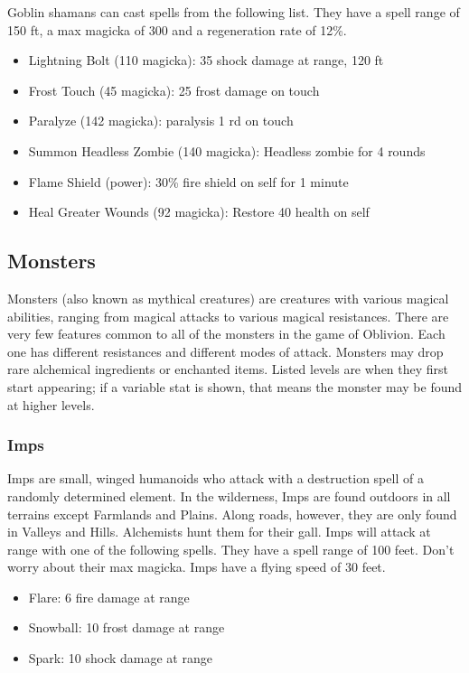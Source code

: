 \documentclass[12pt]{book}
\begin{document}
Goblin shamans can cast spells from the following list. They have a spell range of 150 ft, a max magicka of 300 and a regeneration rate of 12\%.\\
\begin{itemize}
	\item Lightning Bolt (110 magicka): 35 shock damage at range, 120 ft
	\item Frost Touch (45 magicka): 25 frost damage on touch
	\item Paralyze (142 magicka): paralysis 1 rd on touch
	\item Summon Headless Zombie (140 magicka): Headless zombie for 4 rounds
	\item Flame Shield (power): 30\% fire shield on self for 1 minute
	\item Heal Greater Wounds (92 magicka): Restore 40 health on self
\end{itemize}

\subsection{Monsters}
Monsters (also known as mythical creatures) are creatures with various magical abilities, ranging from magical attacks to various magical resistances. There are very few features common to all of the monsters in the game of Oblivion. Each one has different resistances and different modes of attack. Monsters may drop rare alchemical ingredients or enchanted items. Listed levels are when they first start appearing; if a variable stat is shown, that means the monster may be found at higher levels.

\subsubsection{Imps}
Imps are small, winged humanoids who attack with a destruction spell of a randomly determined element. In the wilderness, Imps are found outdoors in all terrains except Farmlands and Plains. Along roads, however, they are only found in Valleys and Hills. Alchemists hunt them for their gall. Imps will attack at range with one of the following spells. They have a spell range of 100 feet. Don't worry about their max magicka. Imps have a flying speed of 30 feet.

\begin{itemize}
	\item Flare: 6 fire damage at range
	\item Snowball: 10 frost damage at range
	\item Spark: 10 shock damage at range
\end{itemize}
\end{document}
